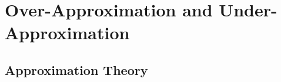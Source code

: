 \chapter{Over-Approximation and Under-Approximation}
\section{Approximation Theory}
\begin{comment}
$F = \exists x_1 \in I_1 \cdots x_n \in I_n. \bigwedge \limits_j \psi_j(x_1,\cdots,x_n)$, 
where $\psi_j(x_1,\cdots,x_n)$ is an atomic formula. 
%
$F$ is equivalnet to 
$\exists x_1 \ldots x_n. (\bigwedge \limits_i x_i \in I_i) \wedge (\bigwedge \limits_j \psi_j(x_1,\cdots,x_n))$, 
and we call $\bigwedge \limits_i x_i \in I_i$ {\em interval constraints}, and 
we refer $\bigwedge \limits_j \psi_j(x_1,\cdots,x_n)$ by $\psi(x_1,\cdots,x_n)$. 
Initially, interval constraints have a form of the conjunction $\bigwedge \limits_i x_i \in I_i$, 
and later by refinement, $x_i \in I_i$ is decomposed into a clause $\bigvee_j x_i \in I_{i_j}$, 
which makes a CNF. 

As an SMT (SAT modulo theory) problem, 
boolean variables are assigned to each $x_i \in I_{i_j}$, 
and truth assignments is produced by a SAT solver, 
which are proved or disproved by a background theory $T$ whether it satisfies $\psi(x_1,\cdots,x_n)$. 

As notational convention, $m$ (the lower case) denotes 
a variable assignments on $x_i$'s, and 
$M$ (the upper case) denotes a truth assignment on $x_i \in I_{i_j}$'s. 
We write $m \in M$ when an instance $m = \{ x_i \leftarrow c_i \}$ satisfies 
all $c_i \in I_{i_j}$ that are assigned true by $M$. 

We assume {\em very lazy theory learning}~\cite{dpll}, and 
a backend theory $T$ is applied only for a full truth assignment $M$. 
\begin{itemize}
\item If an instance $m$ satisfies $\psi(x_1,\cdots,x_n)$, we denote $m \models_T \psi(x_1,\cdots,x_n)$. 
\item If each instance $m$ with $m \in M$ satisfies $\psi(x_1,\cdots,x_n)$, 
we denote $M \models_T \psi(x_1,\cdots,x_n)$. 
\end{itemize}
\end{comment}

